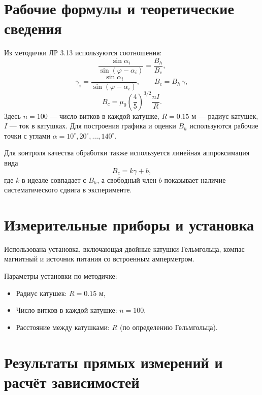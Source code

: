 \documentclass[a4paper,14pt]{extarticle}
\begin{document}
\section{Рабочие формулы и теоретические сведения}

Из методички ЛР 3.13 используются соотношения:
\begin{equation}
\frac{\sin \alpha_i}{\sin (\varphi-\alpha_i)} = \frac{B_h}{B_c},
\end{equation}
\begin{equation}
\gamma_i = \frac{\sin \alpha_i}{\sin (\varphi-\alpha_i)}, \qquad B_c = B_h\,\gamma,
\end{equation}
\begin{equation}
B_c = \mu_0\left(\frac{4}{5}\right)^{3/2}\frac{nI}{R}.
\end{equation}
Здесь $n=100$ --- число витков в каждой катушке, $R=0.15$ м --- радиус катушек, $I$ --- ток в катушках. Для построения графика и оценки $B_h$ используются рабочие точки с углами $\alpha=10^\circ,20^\circ,\dots,140^\circ$.

Для контроля качества обработки также используется линейная аппроксимация вида
\begin{equation}
B_c = k\gamma + b,
\end{equation}
где $k$ в идеале совпадает с $B_h$, а свободный член $b$ показывает наличие систематического сдвига в эксперименте.
\section{Измерительные приборы и установка}

Использована установка, включающая двойные катушки Гельмгольца, компас магнитный и источник питания со встроенным амперметром.

Параметры установки по методичке:
\begin{itemize}
    \item Радиус катушек: $R=0.15$ м,
    \item Число витков в каждой катушке: $n=100$,
    \item Расстояние между катушками: $R$ (по определению Гельмгольца).
\end{itemize}

\section{Результаты прямых измерений и расчёт зависимостей}
\end{document}
